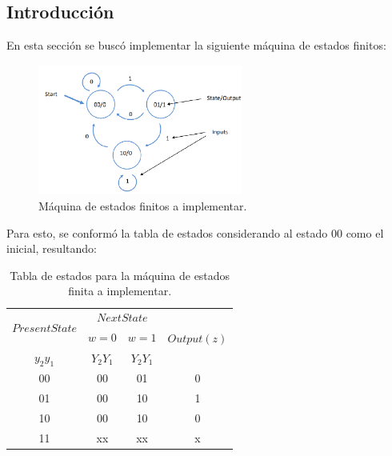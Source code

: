 \subsection{Introducción}

En esta sección se buscó implementar la siguiente máquina de estados finitos:
\begin{figure}[H]
\centering
	\includegraphics[width=0.6\textwidth]{ImagenesEjercicio3/fsm.png}
	\caption{Máquina de estados finitos a implementar.}
	\label{fig:fsmimp}
\end{figure} 

Para esto, se conformó la tabla de estados considerando al estado $00$ como el inicial, resultando:
\begin{table}[H]
\centering
\begin{tabular}{|c|l|c|l|c|l|c|}
\hline
\multicolumn{2}{|c|}{\multirow{2}{*}{$Present State$}} & \multicolumn{4}{c|}{$Next State$} & \multirow{3}{*}{$Output (z)$} \\ \cline{3-6}
\multicolumn{2}{|c|}{} & \multicolumn{2}{c|}{$w=0$} & \multicolumn{2}{c|}{$w=1$} &  \\
\multicolumn{2}{|c|}{$y_2 y_1$} & \multicolumn{2}{c|}{$Y_2Y_1$} & \multicolumn{2}{c|}{$Y_2Y_1$} &  \\ \hline
\multicolumn{2}{|c|}{00} & \multicolumn{2}{c|}{00} & \multicolumn{2}{c|}{01} & 0 \\ \hline
\multicolumn{2}{|c|}{01} & \multicolumn{2}{c|}{00} & \multicolumn{2}{c|}{10} & 1 \\ \hline
\multicolumn{2}{|c|}{10} & \multicolumn{2}{c|}{00} & \multicolumn{2}{c|}{10} & 0 \\ \hline
\multicolumn{2}{|c|}{11} & \multicolumn{2}{c|}{xx} & \multicolumn{2}{c|}{xx} & x \\ \hline
\end{tabular}
\caption{Tabla de estados para la máquina de estados finita a implementar.}
\label{fig:tablaestados}
\end{table}

